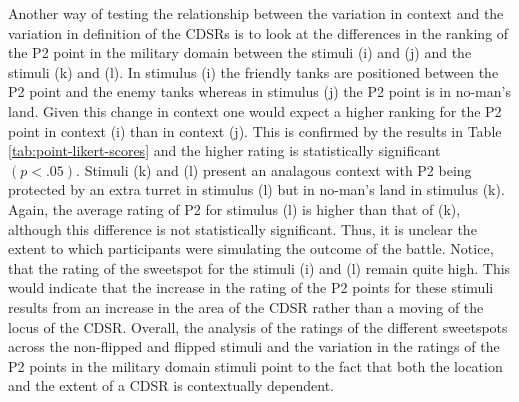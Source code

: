 \documentclass[11pt,letterpaper]{article}
\begin{document}

Another way of testing the relationship between the variation in context and the variation in definition of the CDSRs is to look at the differences in the ranking of the P2 point in the military domain between the stimuli (i) and (j) and the stimuli (k) and (l). In stimulus (i) the friendly tanks are positioned between the P2 point and the enemy tanks whereas in stimulus (j) the P2 point is in no-man's land. Given this change in context one would expect a higher ranking for the P2 point in context (i) than in context (j). This is confirmed by the results in Table \ref{tab:point-likert-scores} and the higher rating is statistically significant $(p<.05)$. Stimuli (k) and (l) present an analagous context with P2 being protected by an extra turret in stimulus (l) but in no-man's land in stimulus (k). Again, the average rating of P2 for stimulus (l) is higher than that of (k), although this difference is not statistically significant. Thus, it is unclear the extent to which participants were simulating the outcome of the battle. Notice, that the rating of the sweetspot for the stimuli (i) and (l) remain quite high. This would indicate that the increase in the rating of the P2 points for these stimuli results from an increase in the area of the CDSR rather than a moving of the locus of the CDSR. Overall, the analysis of the ratings of the different sweetspots across the non-flipped and flipped stimuli and the variation in the ratings of the P2 points in the military domain stimuli point to the fact that both the location and the extent of a CDSR is contextually dependent.


\end{document}
